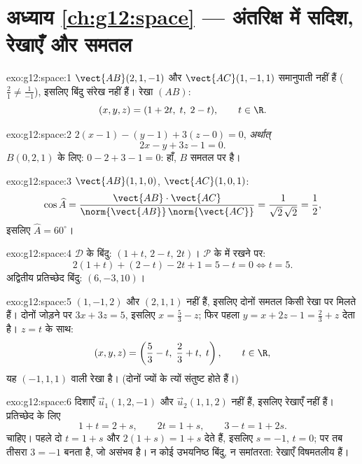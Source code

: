 \section*{अध्याय \ref{ch:g12:space} --- अंतरिक्ष में सदिश, रेखाएँ और समतल}

\begin{solution}{exo:g12:space:1}
$\vect{AB}(2, 1, -1)$ और $\vect{AC}(1, -1, 1)$ समानुपाती नहीं हैं ($\frac21 \neq \frac{1}{-1}$), इसलिए बिंदु संरेख नहीं हैं। रेखा $(AB)$:
\[
(x, y, z) = (1 + 2t,\; t,\; 2 - t), \qquad t \in \R .
\]
\end{solution}

\begin{solution}{exo:g12:space:2}
$2(x - 1) - (y - 1) + 3(z - 0) = 0$, \emph{अर्थात्}
\[
2x - y + 3z - 1 = 0 .
\]
$B(0,2,1)$ के लिए: $0 - 2 + 3 - 1 = 0$: हाँ, $B$ समतल पर है।
\end{solution}

\begin{solution}{exo:g12:space:3}
$\vect{AB}(1,1,0)$, $\vect{AC}(1,0,1)$:
\[
\cos\widehat{A}
= \frac{\vect{AB}\cdot\vect{AC}}{\norm{\vect{AB}}\,\norm{\vect{AC}}}
= \frac{1}{\sqrt2\,\sqrt2} = \frac12,
\]
इसलिए $\widehat A = 60^\circ$।
\end{solution}

\begin{solution}{exo:g12:space:4}
$\mathcal D$ के बिंदु: $(1 + t,\, 2 - t,\, 2t)$। $\mathcal P$ के  में रखने पर:
\[
2(1+t) + (2 - t) - 2t + 1 = 5 - t = 0 \iff t = 5 .
\]
अद्वितीय प्रतिच्छेद बिंदु: $(6, -3, 10)$।
\end{solution}

\begin{solution}{exo:g12:space:5}
 $(1, -1, 2)$ और $(2, 1, 1)$  नहीं हैं, इसलिए दोनों समतल किसी रेखा पर मिलते
हैं। दोनों  जोड़ने पर $3x + 3z = 5$, इसलिए $x = \frac53 - z$; फिर पहला  $y = x + 2z - 1 = \frac23 + z$ देता है।
$z = t$ के साथ:
\[
(x, y, z) = \left(\frac53 - t,\; \frac23 + t,\; t\right), \qquad t \in \R,
\]
यह  $(-1, 1, 1)$ वाली रेखा है। (दोनों  ज्यों के त्यों संतुष्ट होते
हैं।)
\end{solution}

\begin{solution}{exo:g12:space:6}
दिशाएँ $\vec u_1(1, 2, -1)$ और $\vec u_2(1, 1, 2)$  नहीं हैं, इसलिए रेखाएँ  नहीं हैं। प्रतिच्छेद
के लिए
\[
1 + t = 2 + s, \qquad 2t = 1 + s, \qquad 3 - t = 1 + 2s .
\]
चाहिए। पहले दो $t = 1 + s$ और $2(1+s) = 1 + s$ देते हैं, इसलिए $s = -1$, $t = 0$; पर तब तीसरा $3 = -1$
बनता है, जो असंभव है। न कोई उभयनिष्ठ बिंदु, न समांतरता: रेखाएँ विषमतलीय हैं।
\end{solution}

